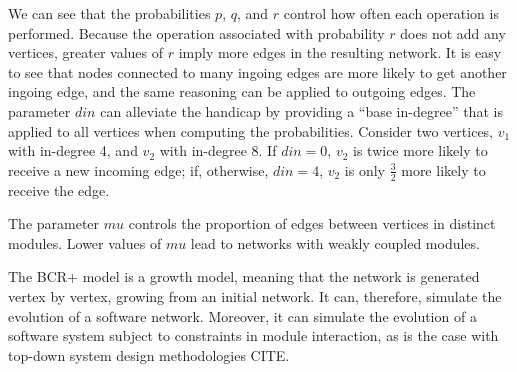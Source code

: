 We can see that the probabilities $p$, $q$, and $r$ control how often each
operation is performed. Because the operation associated with probability $r$
does not add any vertices, greater values of $r$ imply more edges in the
resulting network. It is easy to see that nodes connected to many ingoing edges
are more likely to get another ingoing edge, and the same reasoning can be
applied to outgoing edges. The parameter $din$ can alleviate the handicap by
providing a ``base in-degree'' that is applied to all vertices when computing
the probabilities. Consider two vertices, $v_1$ with in-degree 4, and $v_2$ with
in-degree 8. If $din = 0$, $v_2$ is twice more likely to receive a new incoming
edge; if, otherwise, $din = 4$, $v_2$ is only $\frac{3}{2}$ more likely to
receive the edge.

The parameter $mu$ controls the proportion of edges between vertices in distinct
modules. Lower values of $mu$ lead to networks with weakly coupled modules.

The BCR+ model is a growth model, meaning that the network is generated vertex
by vertex, growing from an initial network. It can, therefore, simulate the
evolution of a software network. Moreover, it can simulate the evolution of a
software system subject to constraints in module interaction, as is the case
with top-down system design methodologies CITE.

%
%
%
%

